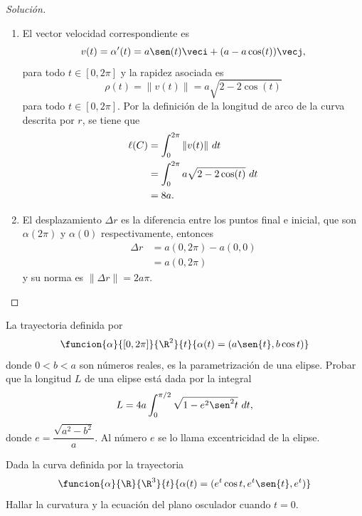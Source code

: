 \documentclass[a4,11pt]{aleph-notas}
\begin{document}
\begin{proof}[Solución]
\begin{enumerate}
	  \item
	 	El vector velocidad correspondiente es
    	\[
       		v(t)=\alpha'(t)= a \sen(t) \veci+(a-a \cos (t)) \vecj,
        \]
    	para todo $t\in[0,2\pi]$ y la rapidez asociada es
    	\[
            \rho(t) = \| v(t) \| = a \sqrt{2-2\cos(t)} 
      	\]
    	para todo $t\in\left[0,2\pi\right]$. Por la definición de la longitud de arco de la curva descrita por $r$, se tiene que
    	\begin{align*}
    		\ell(C)
                & =\int_0^{2\pi} \|v(t)\|\ dt\\
                & =\int_0^{2\pi}a \sqrt{2-2\cos(t)}\  dt\\
                & =8a.\qedhere
        \end{align*}
    \item
        El desplazamiento $\Delta r$ es la diferencia entre los puntos final e inicial, que son $\alpha(2\pi)$ y $\alpha(0)$ respectivamente, entonces
        \begin{align*}
            \Delta r&=a(0,2\pi)-a(0,0)\\
            &=a(0,2\pi)
        \end{align*}
        y su norma es $\| \Delta r\|=2a\pi$.
    \end{enumerate}
\end{proof}

\begin{ejer}
La trayectoria definida por
	\[
        \funcion{\alpha}{[0, 2\pi]}{\R^2}{t}
        {\alpha(t) = (a\sen{t}, b\cos{t})}
	\]
    donde $0 < b < a$ son números reales, es la parametrización de una elipse. Probar que la longitud $L$ de una elipse está dada por la integral
    \[
        L = 4a\int_{0}^{\pi/2}{\sqrt{1 - e^{2}\sen^{2}{t}}\ dt,}
    \]
    donde $e = \dfrac{\sqrt{a^{2} - b^{2}}}{a}$. Al número $e$ se lo llama excentricidad de la elipse.
\end{ejer}

\begin{ejer}
Dada la curva definida por la trayectoria
    \[
        \funcion{\alpha}{\R}{\R^3}
        {t}{\alpha(t) = (e^{t}\cos{t}, e^{t}\sen{t}, e^{t})}
	\]
    Hallar la curvatura y la ecuación del plano osculador cuando $t = 0$.
\end{ejer}
\end{document}
